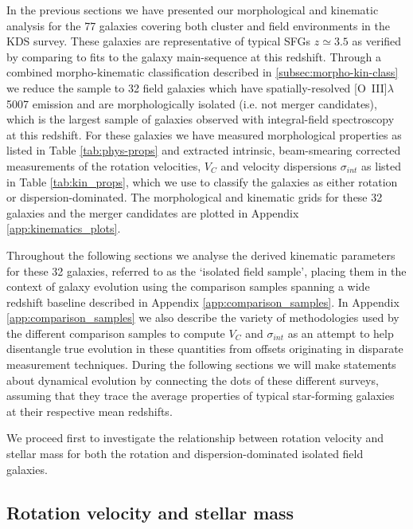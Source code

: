 \documentclass[fleqn,usenatbib]{mn2e}
\begin{document}
In the previous sections we have presented our morphological and kinematic analysis for the 77 galaxies covering both cluster and field environments in the KDS survey.
These galaxies are representative of typical SFGs $z\simeq3.5$ as verified by comparing to fits to the galaxy main-sequence at this redshift.
Through a combined morpho-kinematic classification described in \cref{subsec:morpho-kin-class} we reduce the sample to 32 field galaxies which have spatially-resolved [O~{\sc III}]$\lambda$5007 emission and are morphologically isolated (i.e. not merger candidates), which is the largest sample of galaxies observed with integral-field spectroscopy at this redshift.
For these galaxies we have measured morphological properties as listed in Table \ref{tab:phys-props} and extracted intrinsic, beam-smearing corrected measurements of the rotation velocities, $V_{C}$ and velocity dispersions $\sigma_{int}$ as listed in Table \ref{tab:kin_props}, which we use to classify the galaxies as either rotation or dispersion-dominated.
The morphological and kinematic grids for these 32 galaxies and the merger candidates are plotted in Appendix \ref{app:kinematics_plots}.

Throughout the following sections we analyse the derived kinematic parameters for these 32 galaxies, referred to as the `isolated field sample', placing them in the context of galaxy evolution using the comparison samples spanning a wide redshift baseline described in Appendix \ref{app:comparison_samples}.
In Appendix \ref{app:comparison_samples} we also describe the variety of methodologies used by the different comparison samples to compute $V_{C}$ and $\sigma_{int}$ as an attempt to help disentangle true evolution in these quantities from offsets originating in disparate measurement techniques.
During the following sections we will make statements about dynamical evolution by connecting the dots of these different surveys, assuming that they trace the average properties of typical star-forming galaxies at their respective mean redshifts.

We proceed first to investigate the relationship between rotation velocity and stellar mass for both the rotation and dispersion-dominated isolated field galaxies.

\subsection{Rotation velocity and stellar mass}\label{subsec:results_rotation_vel}
\end{document}
